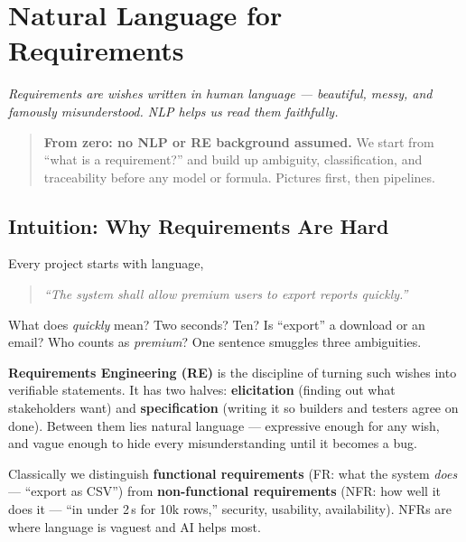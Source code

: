 \chapter{Natural Language for Requirements}\label{ch:requirements}
\begin{center}\small\textit{Requirements are wishes written in human language --- beautiful, messy, and famously misunderstood. NLP helps us read them faithfully.}\end{center}

\begin{quote}\small\textbf{From zero: no NLP or RE background assumed.} We start from ``what is a requirement?'' and build up ambiguity, classification, and traceability before any model or formula. Pictures first, then pipelines.\end{quote}

\noindent{}
\vspace{0.4em}

\section{Intuition: Why Requirements Are Hard}\label{sec:req-intuition}
Every project starts with language,
\begin{quote}\small\emph{``The system shall allow premium users to export reports quickly.''}\end{quote}
What does \emph{quickly} mean? Two seconds? Ten? Is ``export'' a download or an email? Who counts as \emph{premium}? One sentence smuggles three ambiguities.

\textbf{Requirements Engineering (RE)} is the discipline of turning such wishes into verifiable statements. It has two halves: \textbf{elicitation} (finding out what stakeholders want) and \textbf{specification} (writing it so builders and testers agree on done). Between them lies natural language --- expressive enough for any wish, and vague enough to hide every misunderstanding until it becomes a bug.

Classically we distinguish \textbf{functional requirements} (FR: what the system \emph{does} --- ``export as CSV'') from \textbf{non-functional requirements} (NFR: how well it does it --- ``in under 2\,s for 10k rows,'' security, usability, availability). NFRs are where language is vaguest and AI helps most.

